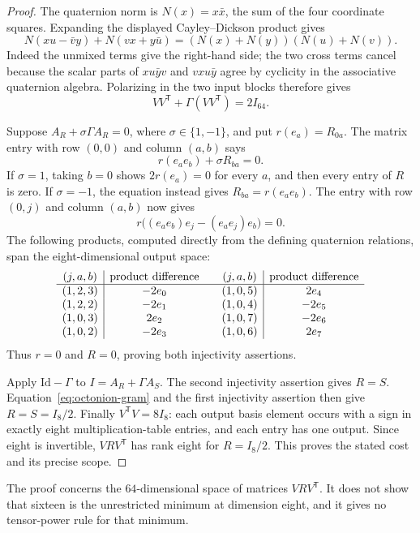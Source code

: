 \begin{proof}
The quaternion norm is $N(x)=x\bar x$, the sum of the four
coordinate squares. Expanding the displayed Cayley--Dickson
product gives
\[
 N(xu-\bar v y)+N(vx+y\bar u)
  =(N(x)+N(y))(N(u)+N(v)).
\]
Indeed the unmixed terms give the right-hand side; the two cross
terms cancel because the scalar parts of $xu\bar yv$ and
$vxu\bar y$ agree by cyclicity in the associative quaternion
algebra. Polarizing in the two input blocks therefore gives
\begin{equation}\label{eq:octonion-gram}
 VV^{\mathsf T}+\Gamma(VV^{\mathsf T})=2I_{64}.
\end{equation}

Suppose $A_R+\sigma\Gamma A_R=0$, where $\sigma\in\{1,-1\}$,
and put $r(e_a)=R_{0a}$. The matrix entry with row $(0,0)$
and column $(a,b)$ says
\[
 r(e_ae_b)+\sigma R_{ba}=0.
\]
If $\sigma=1$, taking $b=0$ shows $2r(e_a)=0$ for every $a$,
and then every entry of $R$ is zero. If $\sigma=-1$, the equation
instead gives $R_{ba}=r(e_ae_b)$. The entry with row $(0,j)$
and column $(a,b)$ now gives
\[
 r\bigl((e_ae_b)e_j-(e_ae_j)e_b\bigr)=0.
\]
The following products, computed directly from the defining
quaternion relations, span the eight-dimensional output space:
\[
\begin{array}{c|c@{\qquad}c|c}
(j,a,b)&\text{product difference}&(j,a,b)&\text{product difference}\\ \hline
(1,2,3)&-2e_0&(1,0,5)&2e_4\\
(1,2,2)&-2e_1&(1,0,4)&-2e_5\\
(1,0,3)&2e_2&(1,0,7)&-2e_6\\
(1,0,2)&-2e_3&(1,0,6)&2e_7
\end{array}
\]
Thus $r=0$ and $R=0$, proving both injectivity assertions.

Apply $\mathrm{Id}-\Gamma$ to $I=A_R+\Gamma A_S$.
The second injectivity assertion gives $R=S$.
Equation~\eqref{eq:octonion-gram} and the first injectivity assertion
then give $R=S=I_8/2$. Finally $V^{\mathsf T}V=8I_8$:
each output basis element occurs with a sign in exactly eight
multiplication-table entries, and each entry has one output.
Since eight is invertible, $VRV^{\mathsf T}$ has rank eight for
$R=I_8/2$. This proves the stated cost and its precise scope.
\end{proof}

The proof concerns the $64$-dimensional space of matrices
$VRV^{\mathsf T}$. It does not show that sixteen is the unrestricted
minimum at dimension eight, and it gives no tensor-power rule for
that minimum.
